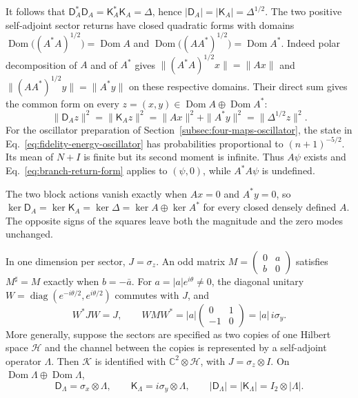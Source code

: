 \documentclass[11pt]{article}
\theoremstyle{definition}
\newcommand{\C}{\mathbb C}
\begin{document}
It follows that $\mathsf D_A^*\mathsf D_A=\mathsf K_A^*\mathsf K_A=\Delta$, hence $|\mathsf D_A|=|\mathsf K_A|=\Delta^{1/2}$. The two positive self-adjoint sector returns have closed quadratic forms with domains $\operatorname{Dom}\bigl((A^*A)^{1/2}\bigr)=\operatorname{Dom}A$ and $\operatorname{Dom}\bigl((AA^*)^{1/2}\bigr)=\operatorname{Dom}A^*$. Indeed polar decomposition of $A$ and of $A^*$ gives $\|(A^*A)^{1/2}x\|=\|Ax\|$ and $\|(AA^*)^{1/2}y\|=\|A^*y\|$ on these respective domains. Their direct sum gives the common form on every $z=(x,y)\in\operatorname{Dom}A\oplus\operatorname{Dom}A^*$:
\begin{equation}
 \|\mathsf D_A z\|^2=\|\mathsf K_A z\|^2=\|Ax\|^2+\|A^*y\|^2
 =\|\Delta^{1/2}z\|^2 .
 \label{eq:branch-return-form}
\end{equation}
For the oscillator preparation of Section~\ref{subsec:four-maps-oscillator}, the state in Eq.~\eqref{eq:fidelity-energy-oscillator} has probabilities proportional to $(n+1)^{-5/2}$. Its mean of $N+I$ is finite but its second moment is infinite. Thus $A\psi$ exists and Eq.~\eqref{eq:branch-return-form} applies to $(\psi,0)$, while $A^*A\psi$ is undefined.

The two block actions vanish exactly when $Ax=0$ and $A^*y=0$, so $\ker\mathsf D_A=\ker\mathsf K_A=\ker\Delta=\ker A\oplus\ker A^*$ for every closed densely defined $A$. The opposite signs of the squares leave both the magnitude and the zero modes unchanged.

In one dimension per sector, $J=\sigma_z$. An odd matrix $M=\left(\begin{smallmatrix}0&a\\b&0\end{smallmatrix}\right)$ satisfies $M^\sharp=M$ exactly when $b=-\bar a$. For $a=|a|e^{i\theta}\ne0$, the diagonal unitary $W=\operatorname{diag}(e^{-i\theta/2},e^{i\theta/2})$ commutes with $J$, and
\begin{equation}
 W^*JW=J,\qquad WMW^*=|a|\begin{pmatrix}0&1\\-1&0\end{pmatrix}=|a|\,i\sigma_y .
 \label{eq:odd-scalar-normal-form}
\end{equation}
More generally, suppose the sectors are specified as two copies of one Hilbert space $\mathcal H$ and the channel between the copies is represented by a self-adjoint operator $\Lambda$. Then $\mathcal K$ is identified with $\C^2\otimes\mathcal H$, with $J=\sigma_z\otimes I$. On $\operatorname{Dom}\Lambda\oplus\operatorname{Dom}\Lambda$,
\begin{equation}
 \mathsf D_\Lambda=\sigma_x\otimes\Lambda,\qquad
 \mathsf K_\Lambda=i\sigma_y\otimes\Lambda,\qquad
 |\mathsf D_\Lambda|=|\mathsf K_\Lambda|=I_2\otimes|\Lambda| .
 \label{eq:balanced-channel-branches}
\end{equation}
\end{document}
